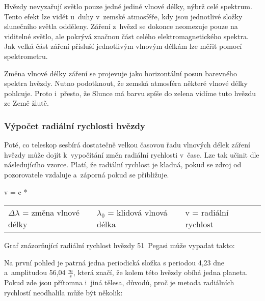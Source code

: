 \documentclass[a4paper,12pt]{article}
\begin{document}
{Hvězdy nevyzařují světlo pouze jedné jediné vlnové délky, nýbrž celé spektrum. Tento efekt lze vidět  u~duhy v~zemské atmosféře, kdy jsou jednotlivé složky slunečního světla odděleny. Záření z~hvězd se dokonce neomezuje pouze na viditelné světlo, ale pokrývá značnou část celého elektromagnetického spektra. Jak velká část záření přísluší jednotlivým vlnovým délkám lze měřit pomocí spektrometru.


Změna vlnové délky záření se projevuje jako horizontální posun barevného spektra hvězdy. Nutno podotknout, že zemská atmosféra některé vlnové délky pohlcuje. Proto i~přesto, že Slunce má barvu spíše do zelena vidíme tuto hvězdu ze Země žlutě.

\subsubsection{Výpočet radiální rychlosti hvězdy}

Poté, co teleskop sesbírá dostatečně velkou časovou řadu vlnových délek záření hvězdy může dojít k~vypočítání změn radiální rychlosti v~čase. Lze tak učinit dle následujícího vzorce. Platí, že radiální rychlost je kladná, pokud se zdroj od pozorovatele vzdaluje a~záporná pokud se přibližuje.

 {v = c * }{
\begin{tabular}{lll}
	$\Delta\lambda$ = změna vlnové délky & $\lambda_0$ = klidová vlnová délka & v = radiální rychlost \
\end{tabular}
}

Graf znázorňující radiální rychlost hvězdy 51~Pegasi může vypadat takto:

\footnotetext[1]{Vytvořeno autorem za využití dat z~\cite{51pegasi}.}

Na první pohled je patrná jedna periodická složka s periodou 4,23 dne a~amplitudou 56,04 $\frac{m}{s}$, která značí, že kolem této hvězdy obíhá jedna planeta. Pokud zde jsou přítomna i~jiná tělesa, důvodů, proč je metoda radiálních rychlostí neodhalila může být několik:

}
\end{document}
